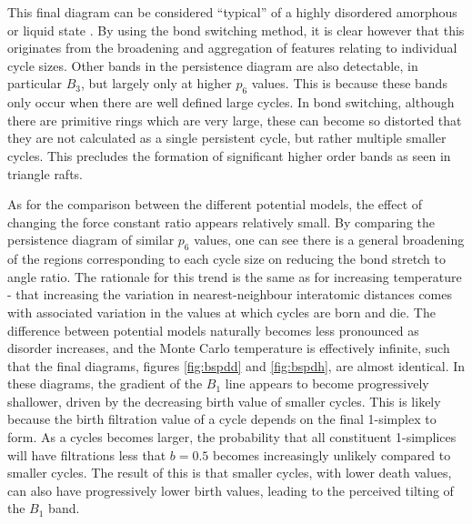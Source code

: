 This final diagram can be considered ``typical'' of a highly disordered amorphous or liquid state \cite{Hiraoka2016,Onodera2019}.
By using the bond switching method, it is clear however that this originates from the broadening and aggregation of features relating to individual cycle sizes.
Other bands in the persistence diagram are also detectable, in particular $B_3$, but largely only at higher $p_6$ values. 
This is because these bands only occur when there are well defined large cycles.
In bond switching, although there are primitive rings which are very large, these can become so distorted that they are not calculated as a single persistent cycle, but rather multiple smaller cycles.
This precludes the formation of significant higher order bands as seen in triangle rafts. 


As for the comparison between the different potential models, the effect of changing the force constant ratio appears relatively small.
By comparing the persistence diagram of similar $p_6$ values, one can see there is a general broadening of the regions corresponding to each cycle size on reducing the bond stretch to angle ratio.
The rationale for this trend is the same as for increasing temperature - that increasing the variation in nearest\--neighbour interatomic distances comes with associated variation in the values at which cycles are born and die.
The difference between potential models naturally becomes less pronounced as disorder increases, and the Monte Carlo temperature is effectively infinite, such that the final diagrams, figures \ref{fig:bspdd} and \ref{fig:bspdh}, are almost identical.
In these diagrams, the gradient of the $B_1$ line appears to become progressively shallower, driven by the decreasing birth value of smaller cycles.
This is likely because the birth filtration value of a cycle depends on the final 1\--simplex to form.
As a cycles becomes larger, the probability that all constituent 1\--simplices will have filtrations less that $b=0.5$ becomes increasingly unlikely compared to smaller cycles.
The result of this is that smaller cycles, with lower death values, can also have progressively lower birth values, leading to the perceived tilting of the $B_1$ band.

